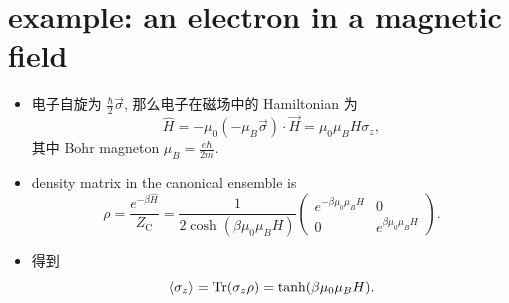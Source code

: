 \section{example: an electron in a magnetic field}
\begin{itemize}
	\item 电子自旋为 $\frac{\hbar}{2} \vec{\sigma}$, 那么电子在磁场中的 Hamiltonian 为
	\begin{equation}
		\hat{H} = - \mu_0 (- \mu_B \vec{\sigma}) \cdot \vec{H} = \mu_0 \mu_B H \sigma_z,
	\end{equation}
	其中 Bohr magneton $\mu_B = \frac{e \hbar}{2 m}$.
	
	\item density matrix in the canonical ensemble is
	\begin{equation}
		\rho = \frac{e^{- \beta \hat{H}}}{Z_\text{C}} = \frac{1}{2 \cosh(\beta \mu_0 \mu_B H)} \begin{pmatrix}
			e^{- \beta \mu_0 \mu_B H} & 0 \\
			0 & e^{\beta \mu_0 \mu_B H}
		\end{pmatrix}.
	\end{equation}
	
	\item 得到
	\begin{equation}
		\braket{\sigma_z} = \mathrm{Tr}(\sigma_z \rho) = \tanh(\beta \mu_0 \mu_B H).
	\end{equation}
\end{itemize}

